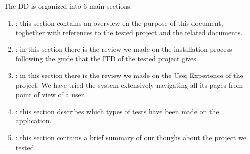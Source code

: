 The DD is organized into 6 main sections:

\begin{enumerate}
\item {\textbf{}}: this section contains an overview on the purpose of this document, toghether with references to the tested project and the related documents.
\item {\textbf{}}: in this section there is the review we made on the installation process following the guide that the ITD of the tested project gives. 
\item {\textbf{}}: in this section there is the review we made on the User Experience of the project. We have tried the system extensively navigating all its pages from point of view of a user.
\item {\textbf{}}: this section describes which types of tests have been made on the application.
\item {\textbf{}}: this section contains a brief summary of our thoughs about the project we tested.
\end{enumerate}